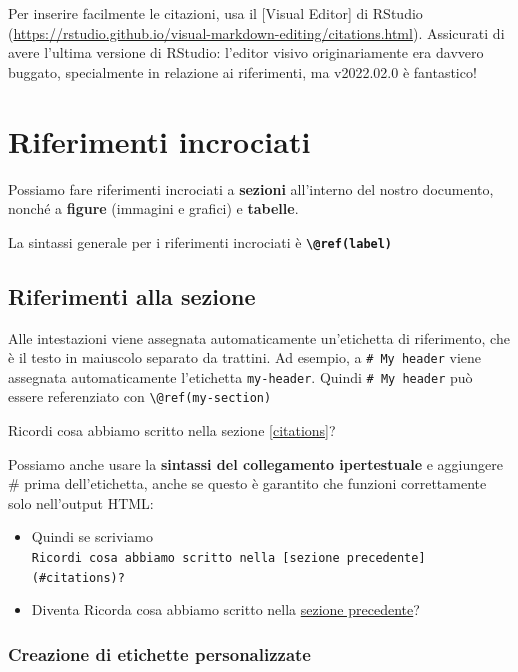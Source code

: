 \documentclass[a4paper, 11pt, nobind]{templates/ociamthesis}
\providecommand{\tightlist}{%
  \setlength{\itemsep}{0pt}\setlength{\parskip}{0pt}}
\begin{document}
Per inserire facilmente le citazioni, usa il {[}Visual Editor{]} di RStudio (\url{https://rstudio.github.io/visual-markdown-editing/citations.html}).
Assicurati di avere l'ultima versione di RStudio: l'editor visivo originariamente era davvero buggato, specialmente in relazione ai riferimenti, ma v2022.02.0 è fantastico!

\hypertarget{riferimenti-incrociati}{%
\section{Riferimenti incrociati}\label{riferimenti-incrociati}}

Possiamo fare riferimenti incrociati a \textbf{sezioni} all'interno del nostro documento, nonché a \textbf{figure} (immagini e grafici) e \textbf{tabelle}.

La sintassi generale per i riferimenti incrociati è \textbf{\texttt{\textbackslash{}@ref(label)}}

\hypertarget{riferimenti-alla-sezione}{%
\subsection{Riferimenti alla sezione}\label{riferimenti-alla-sezione}}

Alle intestazioni viene assegnata automaticamente un'etichetta di riferimento, che è il testo in maiuscolo separato da trattini. Ad esempio, a \texttt{\#\ My\ header} viene assegnata automaticamente l'etichetta \texttt{my-header}. Quindi \texttt{\#\ My\ header} può essere referenziato con \texttt{\textbackslash{}@ref(my-section)}

Ricordi cosa abbiamo scritto nella sezione \ref{citations}?

Possiamo anche usare la \textbf{sintassi del collegamento ipertestuale} e aggiungere \# prima dell'etichetta, anche se questo è garantito che funzioni correttamente solo nell'output HTML:

\begin{itemize}
\tightlist
\item
  Quindi se scriviamo \texttt{Ricordi\ cosa\ abbiamo\ scritto\ nella\ {[}sezione\ precedente{]}(\#citations)?}
\item
  Diventa Ricorda cosa abbiamo scritto nella \protect\hyperlink{citations}{sezione precedente}?
\end{itemize}

\hypertarget{creazione-di-etichette-personalizzate}{%
\subsubsection{Creazione di etichette personalizzate}\label{creazione-di-etichette-personalizzate}}
\end{document}

